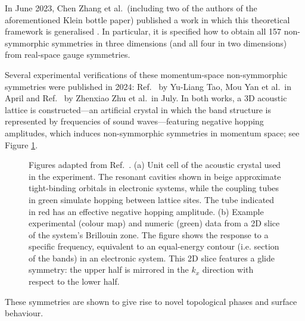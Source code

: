 In June 2023, Chen Zhang et al.\ (including two of the authors of the aforementioned Klein bottle paper) published a work in which this theoretical framework is generalised \cite{Zhang_nonsymmorphic}. In particular, it is specified how to obtain all 157 non-symmorphic symmetries in three dimensions (and all four in two dimensions) from real-space gauge symmetries.

Several experimental verifications of these momentum-space non-symmorphic symmetries were published in 2024: Ref.~\cite{TaoYan_acoustic-Klein} by Yu-Liang Tao, Mou Yan et al.\ in April and Ref.~\cite{Zhu_acoustic-Klein-halfturn} by Zhenxiao Zhu et al.\ in July. In both works, a 3D acoustic lattice is constructed---an artificial crystal in which the band structure is represented by frequencies of sound waves---featuring negative hopping amplitudes, which induces non-symmorphic symmetries in momentum space; see Figure \ref{fig:acoustic-Klein}.
\begin{figure}[htb!]
	\centering
	\hfil
	\caption{Figures adapted from Ref.~\cite{Zhu_acoustic-Klein-halfturn}. (a) Unit cell of the acoustic crystal used in the experiment. The resonant cavities shown in beige approximate tight-binding orbitals in electronic systems, while the coupling tubes in green simulate hopping between lattice sites. The tube indicated in red has an effective negative hopping amplitude. (b) Example experimental (colour map) and numeric (green) data from a 2D slice of the system's Brillouin zone. The figure shows the response to a specific frequency, equivalent to an equal-energy contour (i.e. section of the bands) in an electronic system. This 2D slice features a glide symmetry: the upper half is mirrored in the $k_x$ direction with respect to the lower half.} %
	\label{fig:acoustic-Klein}
\end{figure}
These symmetries are shown to give rise to novel topological phases and surface behaviour.

